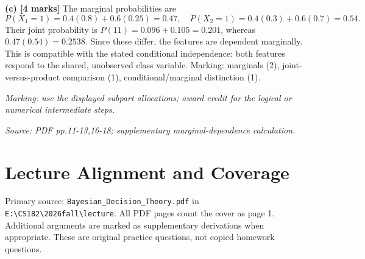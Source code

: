 \documentclass[11pt,a4paper]{article}
\begin{document}
\textbf{(c) [4 marks]} The marginal probabilities are
\[
P(X_1=1)=0.4(0.8)+0.6(0.25)=0.47,\quad
P(X_2=1)=0.4(0.3)+0.6(0.7)=0.54.
\]
Their joint probability is \(P(11)=0.096+0.105=0.201\), whereas \(0.47(0.54)=0.2538\). Since these differ, the features are dependent marginally. This is compatible with the stated conditional independence: both features respond to the shared, unobserved class variable. Marking: marginals (2), joint-versus-product comparison (1), conditional/marginal distinction (1).

\textit{Marking: use the displayed subpart allocations; award credit for the logical or numerical intermediate steps.}\par
{\footnotesize\textit{Source: PDF pp.11-13,16-18; supplementary marginal-dependence calculation.}}
\newpage\section*{Lecture Alignment and Coverage}
Primary source: \texttt{Bayesian\_Decision\_Theory.pdf} in \texttt{E:\textbackslash CS182\textbackslash 2026fall\textbackslash lecture}. All PDF pages count the cover as page 1. Additional arguments are marked as supplementary derivations when appropriate. These are original practice questions, not copied homework questions.
\end{document}
